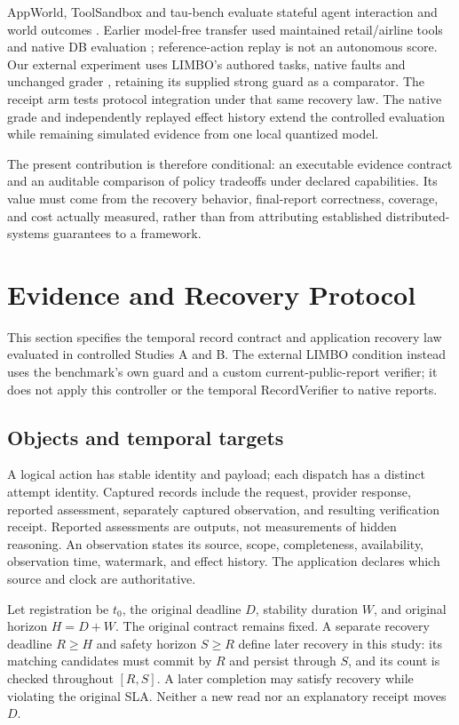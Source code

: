 \documentclass[conference]{IEEEtran}
\begin{document}
AppWorld, ToolSandbox and tau-bench evaluate stateful agent interaction and world outcomes \cite{appworld,toolsandbox,taubench}. Earlier model-free transfer used maintained retail/airline tools and native DB evaluation \cite{tau3tasks,tau3eval}; reference-action replay is not an autonomous score. Our external experiment uses LIMBO's authored tasks, native faults and unchanged grader \cite{limbo,limbosource}, retaining its supplied strong guard as a comparator. The receipt arm tests protocol integration under that same recovery law. The native grade and independently replayed effect history extend the controlled evaluation while remaining simulated evidence from one local quantized model.

The present contribution is therefore conditional: an executable evidence contract and an auditable comparison of policy tradeoffs under declared capabilities. Its value must come from the recovery behavior, final-report correctness, coverage, and cost actually measured, rather than from attributing established distributed-systems guarantees to a framework.

\section{Evidence and Recovery Protocol}

This section specifies the temporal record contract and application recovery law evaluated in controlled Studies A and B. The external LIMBO condition instead uses the benchmark's own guard and a custom current-public-report verifier; it does not apply this controller or the temporal RecordVerifier to native reports.

\subsection{Objects and temporal targets}

A logical action has stable identity and payload; each dispatch has a distinct attempt identity. Captured records include the request, provider response, reported assessment, separately captured observation, and resulting verification receipt. Reported assessments are outputs, not measurements of hidden reasoning. An observation states its source, scope, completeness, availability, observation time, watermark, and effect history. The application declares which source and clock are authoritative.

Let registration be $t_0$, the original deadline $D$, stability duration $W$, and original horizon $H=D+W$. The original contract remains fixed. A separate recovery deadline $R\geq H$ and safety horizon $S\geq R$ define later recovery in this study: its matching candidates must commit by $R$ and persist through $S$, and its count is checked throughout $[R,S]$. A later completion may satisfy recovery while violating the original SLA. Neither a new read nor an explanatory receipt moves $D$.
\end{document}
